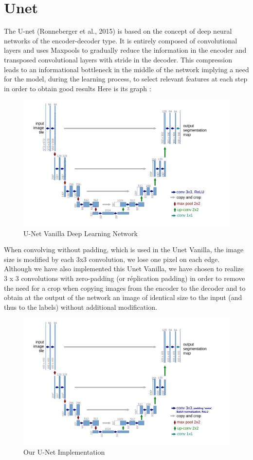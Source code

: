 \documentclass[10pt,conference,compsocconf]{IEEEtran}
\begin{document}
\section{Unet}
The U-net (Ronneberger et al., 2015) is based on the concept of deep neural networks of the encoder-decoder type.
It is entirely composed of convolutional layers and uses Maxpools to gradually reduce the information in the encoder and transposed convolutional layers with stride in the decoder.
This compression leads to an informational bottleneck in the middle of the network implying a need for the model, during the learning process, to select relevant features at each step in order to obtain good results
Here is its graph :
\FloatBarrier
\begin{figure}[ht] \centering
    \includegraphics[width=0.98\columnwidth]{figures/unetvanilla.png}
    \caption{U-Net Vanilla Deep Learning Network}
    \label{fig:unetvanilla}
\end{figure}
\FloatBarrier
When convolving without padding, which is used in the Unet Vanilla, the image size is modified by each 3x3 convolution, we lose one pixel on each edge. Although we have also implemented this Unet Vanilla, we have chosen to realize 3 x 3 convolutions with zero-padding (or réplication padding) in order to remove the need for a crop when copying images from the encoder to the decoder and to obtain at the output of the network an image of identical size to the input (and thus to the labels) without additional modification.
\FloatBarrier
\begin{figure}[ht] \centering
    \includegraphics[width=0.98\columnwidth]{figures/our_unet.png}
    \caption{Our U-Net Implementation}
    \label{fig:unet}
\end{figure}
\end{document}
